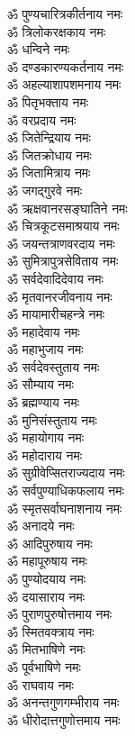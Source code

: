 \begin{multicols}{2}
\begin{flushleft}
ॐ पुण्यचारित्रकीर्तनाय नमः\hfill{}\\
ॐ त्रिलोकरक्षकाय नमः\\
ॐ धन्विने नमः\\
ॐ दण्डकारण्यकर्तनाय नमः\\
ॐ अहल्याशापशमनाय नमः\\
ॐ पितृभक्ताय नमः\\
ॐ वरप्रदाय नमः\\
ॐ जितेन्द्रियाय नमः\\
ॐ जितक्रोधाय नमः\\
ॐ जितामित्राय नमः\\
ॐ जगद्गुरवे नमः\hfill{}\\
ॐ ऋक्षवानरसङ्घातिने नमः\\
ॐ चित्रकूटसमाश्रयाय नमः\\
ॐ जयन्तत्राणवरदाय नमः\\
ॐ सुमित्रापुत्रसेविताय नमः\\
ॐ सर्वदेवादिदेवाय नमः\\
ॐ मृतवानरजीवनाय नमः\\
ॐ मायामारीचहन्त्रे नमः\\
ॐ महादेवाय नमः\\
ॐ महाभुजाय नमः\\
ॐ सर्वदेवस्तुताय नमः\hfill{}\\
ॐ सौम्याय नमः\\
ॐ ब्रह्मण्याय नमः\\
ॐ मुनिसंस्तुताय नमः\\
ॐ महायोगाय नमः\\
ॐ महोदाराय नमः\\
ॐ सुग्रीवेप्सितराज्यदाय नमः\\
ॐ सर्वपुण्याधिकफलाय नमः\\
ॐ स्मृतसर्वाघनाशनाय नमः\\
ॐ अनादये नमः\\
ॐ आदिपुरुषाय नमः\hfill{}\\
ॐ महापूरुषाय नमः\\
ॐ पुण्योदयाय नमः\\
ॐ दयासाराय नमः\\
ॐ पुराणपुरुषोत्तमाय नमः\\
ॐ स्मितवक्त्राय नमः\\
ॐ मितभाषिणे नमः\\
ॐ पूर्वभाषिणे नमः\\
ॐ राघवाय नमः\\
ॐ अनन्तगुणगम्भीराय नमः\\
ॐ धीरोदात्तगुणोत्तमाय नमः\hfill{}\\

\end{flushleft}
\end{multicols}
